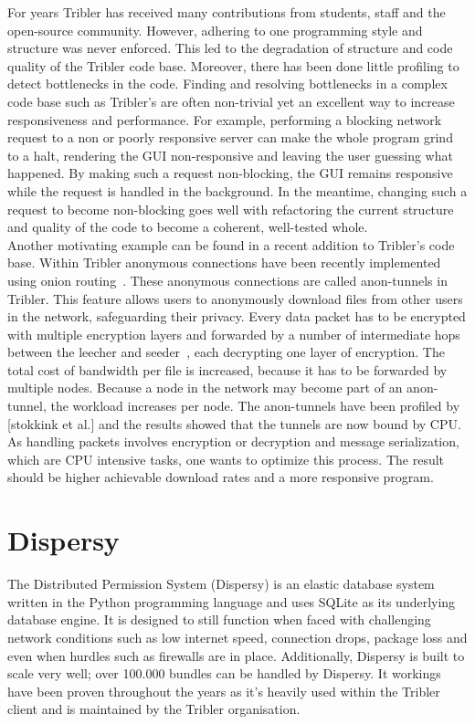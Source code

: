 For years Tribler has received many contributions from students, staff and the open-source community.
However, adhering to one programming style and structure was never enforced.
This led to the degradation of structure and code quality of the Tribler code base.
Moreover, there has been done little profiling to detect bottlenecks in the code.
Finding and resolving bottlenecks in a complex code base such as Tribler's are often non-trivial yet an excellent way to increase responsiveness and performance.
For example, performing a blocking network request to a non or poorly responsive server can make the whole program grind to a halt, rendering the GUI non-responsive and leaving the user guessing what happened.
By making such a request non-blocking, the GUI remains responsive while the request is handled in the background.
In the meantime, changing such a request to become non-blocking goes well with refactoring the current structure and quality of the code to become a coherent, well-tested whole.\\

Another motivating example can be found in a recent addition to Tribler's code base.
Within Tribler anonymous connections have been recently implemented using onion routing~\cite{Plak-anonymous,ruigrok-anonymous,tanaskoski-anonymous}.
These anonymous connections are called anon-tunnels in Tribler.
This feature allows users to anonymously download files from other users in the network, safeguarding their privacy.
Every data packet has to be encrypted with multiple encryption layers and forwarded by a number of intermediate hops between the leecher and seeder~\cite{Plak-anonymous,tanaskoski-anonymous}, each decrypting one layer of encryption.
The total cost of bandwidth per file is increased, because it has to be forwarded by multiple nodes.
Because a node in the network may become part of an anon-tunnel, the workload increases per node.
The anon-tunnels have been profiled by [stokkink et al.]  and the results showed that the tunnels are now bound by CPU.
As handling packets involves encryption or decryption and message serialization, which are CPU intensive tasks, one wants to optimize this process.
The result should be higher achievable download rates and a more responsive program.

\section{Dispersy}
The Distributed Permission System (Dispersy) is an elastic database system written in the Python programming language and uses SQLite as its underlying database engine.
It is designed to still function when faced with challenging network conditions such as low internet speed, connection drops, package loss and even when hurdles such as firewalls are in place.
Additionally, Dispersy is built to scale very well; over 100.000 bundles can be handled by Dispersy.
It workings have been proven throughout the years as it's heavily used within the Tribler client and is maintained by the Tribler organisation.

